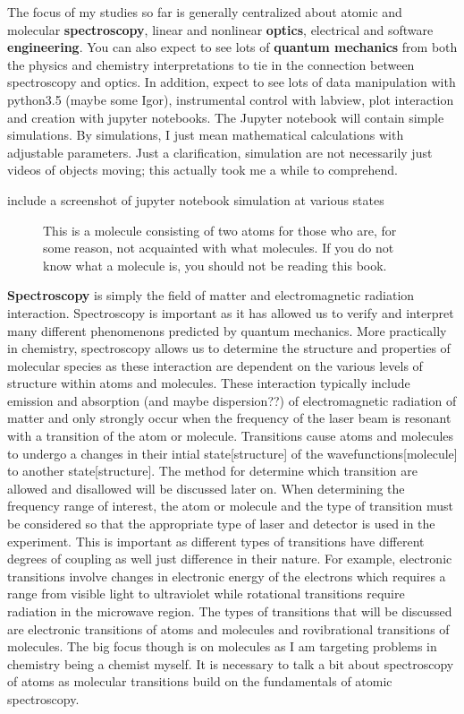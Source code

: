 \documentclass[a4paper]{book}
\newcommand{\imginput}[1]{} %
\begin{document}
	The focus of my studies so far is generally centralized about atomic and molecular {\bfseries spectroscopy}, linear and nonlinear {\bfseries optics}, electrical and software {\bfseries engineering}. You can also expect to see lots of {\bfseries quantum mechanics} from both the physics and chemistry interpretations to tie in the connection between spectroscopy and optics. In addition, expect to see lots of data manipulation with python3.5 (maybe some Igor), instrumental control with labview, plot interaction and creation with jupyter notebooks. The Jupyter notebook will contain simple simulations. By simulations, I just mean mathematical calculations with adjustable parameters. Just a clarification, simulation are not necessarily just videos of objects moving; this actually took me a while to comprehend.
	
	include a screenshot of jupyter notebook simulation at various states
	
	\begin{figure} [!ht]
		\centering
		\def\svgwidth{\columnwidth}
		\huge
		\resizebox{8cm}{!}{\imginput{images/molecule.pdf_tex}}
		\caption{This is a molecule consisting of two atoms for those who are, for some reason, not acquainted with what molecules. If you do not know what a molecule is, you should not be reading this book.}
		\label{fig:molecule-alpha}
	\end{figure}
	
	{\bfseries Spectroscopy} is simply the field of matter and electromagnetic radiation interaction. Spectroscopy is important as it has allowed us to verify and interpret many different phenomenons predicted by quantum mechanics. More practically in chemistry, spectroscopy allows us to determine the structure and properties of molecular species as these interaction are dependent on the various levels of structure within atoms and molecules. These interaction typically include emission and absorption (and maybe dispersion??) of electromagnetic radiation of matter and only strongly occur when the frequency of the laser beam is resonant with a transition of the atom or molecule. Transitions cause atoms and molecules to undergo a changes in their intial state[structure] of the wavefunctions[molecule] to another state[structure]. The method for determine which transition are allowed and disallowed will be discussed later on. When determining the frequency range of interest, the atom or molecule and the type of transition must be considered so that the appropriate type of laser and detector is used in the experiment. This is important as different types of transitions have different degrees of coupling as well just difference in their nature. For example, electronic transitions involve changes in electronic energy of the electrons which requires a range from visible light to ultraviolet while rotational transitions require radiation in the microwave region. The types of transitions that will be discussed are electronic transitions of atoms and molecules and rovibrational transitions of molecules. The big focus though is on molecules as I am targeting problems in chemistry being a chemist myself. It is necessary to talk a bit about spectroscopy of atoms as molecular transitions build on the fundamentals of atomic spectroscopy. 
\end{document}
